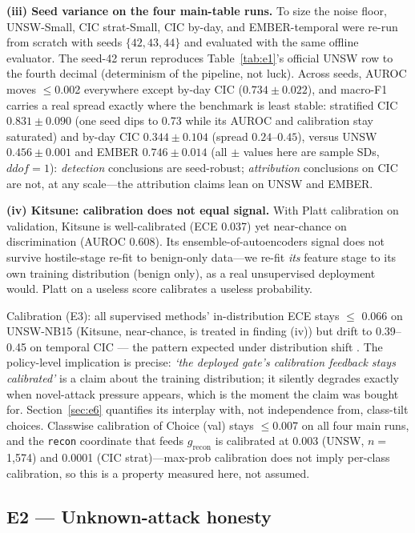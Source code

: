 \documentclass[sigconf,anonymous=false]{acmart}
\begin{document}
\textbf{(iii) Seed variance on the four main-table runs.} To size the noise floor, UNSW-Small, CIC strat-Small, CIC by-day, and EMBER-temporal were re-run from scratch with seeds $\{42,43,44\}$ and evaluated with the same offline evaluator. The seed-42 rerun reproduces Table~\ref{tab:e1}'s official UNSW row to the fourth decimal (determinism of the pipeline, not luck). Across seeds, AUROC moves $\le$0.002 everywhere except by-day CIC ($0.734\pm0.022$), and macro-F1 carries a real spread exactly where the benchmark is least stable: stratified CIC $0.831\pm0.090$ (one seed dips to 0.73 while its AUROC and calibration stay saturated) and by-day CIC $0.344\pm0.104$ (spread $0.24$--$0.45$), versus UNSW $0.456\pm0.001$ and EMBER $0.746\pm0.014$ (all $\pm$ values here are sample SDs, $ddof{=}1$): \emph{detection} conclusions are seed-robust; \emph{attribution} conclusions on CIC are not, at any scale---the attribution claims lean on UNSW and EMBER.

\textbf{(iv) Kitsune: calibration does not equal signal.} With Platt calibration on validation, Kitsune is well-calibrated (ECE 0.037) yet near-chance on discrimination (AUROC 0.608). Its ensemble-of-autoencoders signal does not survive hostile-stage re-fit to benign-only data---we re-fit \emph{its} feature stage to its own training distribution (benign only), as a real unsupervised deployment would. Platt on a useless score calibrates a useless probability.

Calibration (E3): all supervised methods' in-distribution ECE stays $\le$ 0.066 on UNSW-NB15 (Kitsune, near-chance, is treated in finding (iv)) but drift to 0.39--0.45 on temporal CIC --- the pattern expected under distribution shift \cite{ovadia2019trust}. The policy-level implication is precise: \emph{`the deployed gate's calibration feedback stays calibrated'} is a claim about the training distribution; it silently degrades exactly when novel-attack pressure appears, which is the moment the claim was bought for. Section~\ref{sec:e6} quantifies its interplay with, not independence from, class-tilt choices. Classwise calibration of Choice (val) stays $\le$0.007 on all four main runs, and the \texttt{recon} coordinate that feeds $g_{\mathrm{recon}}$ is calibrated at 0.003 (UNSW, $n{=}$1{,}574) and 0.0001 (CIC strat)---max-prob calibration does not imply per-class calibration, so this is a property measured here, not assumed.

\subsection{E2 --- Unknown-attack honesty}
\label{sec:e2}
\end{document}
